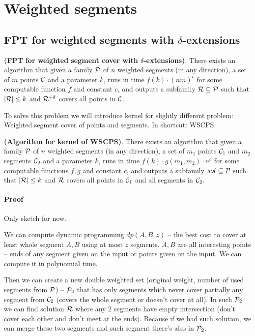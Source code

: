 \section{Weighted segments}
\subsection{FPT for weighted segments with $\delta$-extensions}
\begin{tw}{
	\textbf{(FPT for weighted segment cover with $\delta$-extensions)}.
	There exists an algorithm that given a family $\mathcal{P}$ of
	$n$ weighted segments (in any direction),
	a set of $m$ points $\mathcal{C}$
	and a parameter $k$,
	runs in time $f(k) \cdot (nm)^c$ for some computable function $f$ and constant $c$,
	and outputs a subfamily $\mathcal{R} \subseteq \mathcal{P}$
	such that $|\mathcal{R}| \le k$ and $\mathcal{R}^{+\delta}$ covers all points in $\mathcal{C}$.
}\end{tw}


To solve this problem we will introduce kernel for slightly different
problem: Weighted segment cover of points and segments.
In shortcut: WSCPS.

\begin{lemma}
	\textbf{(Algorithm for kernel of WSCPS)}.
	There exists an algorithm that given a family $\mathcal{P}$ of
	$n$ weighted segments (in any direction),
	a set of $m_1$ points $\mathcal{C}_1$ and $m_2$ segments $\mathcal{C}_2$
	and a parameter $k$,
	runs in time $f(k) \cdot g(m_1, m_2) \cdot n^c$ for some computable functions $f, g$ and constant $c$,
	and outputs a subfamily $sol \subseteq \mathcal{P}$
	such that $|\mathcal{R}| \le k$ and $\mathcal{R}$ covers all points in $\mathcal{C}_1$ and all segments in $\mathcal{C}_2$. 
\end{lemma}
\paragraph{Proof}
Only sketch for now.

We can compute dynamic programming $dp(A, B, z)$ --
the best cost to cover at least whole segment $A, B$
using at most $z$ segments.
$A, B$ are all interesting points -- ends of any segment given on the input or points given on the input.
We can compute it in polynomial time.

Then we can create a new double weighted set (original weight,
number of used segments from $\mathcal{P}$) -- $\mathcal{P}_2$
that has only segments which never cover partially any segment from $\mathcal{C}_2$
(covers the whole segment or doesn't cover at all).
In such $\mathcal{P}_2$ we can find solution $\mathcal{R}$ where any 2 segments
have empty intersection (don't cover each other and don't meet at the ends).
Because if we had such solution, we can merge these two segments and
such segment there's also in $\mathcal{P}_2$.

